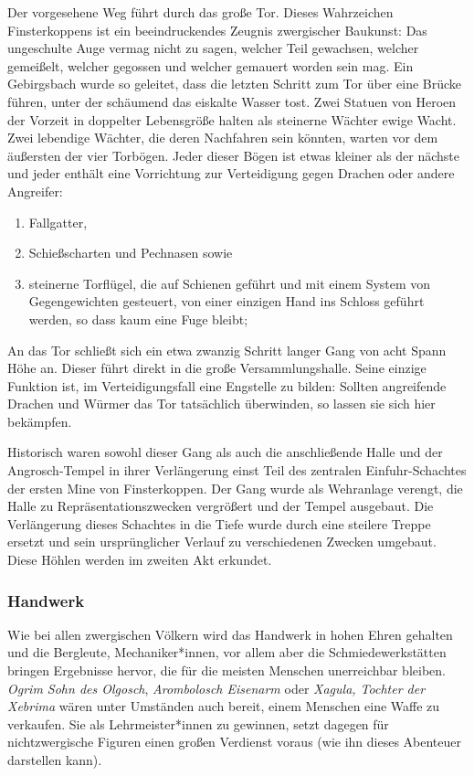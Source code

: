 Der vorgesehene Weg führt durch das große Tor.
Dieses Wahrzeichen Finsterkoppens ist ein beeindruckendes Zeugnis zwergischer Baukunst:
Das ungeschulte Auge vermag nicht zu sagen, welcher Teil gewachsen, welcher gemeißelt, welcher gegossen und welcher gemauert worden sein mag.
Ein Gebirgsbach wurde so geleitet, dass die letzten Schritt zum Tor über eine Brücke führen, unter der schäumend das eiskalte Wasser tost.
Zwei Statuen von Heroen der Vorzeit in doppelter Lebensgröße halten als steinerne Wächter ewige Wacht.
Zwei lebendige Wächter, die deren Nachfahren sein könnten, warten vor dem äußersten der vier Torbögen.
Jeder dieser Bögen ist etwas kleiner als der nächste und  jeder enthält eine Vorrichtung zur Verteidigung gegen Drachen oder andere Angreifer:
\begin{enumerate}\setlength\itemsep {0em}
	\item Fallgatter,
	\item Schießscharten und Pechnasen sowie
	\item steinerne Torflügel, die auf Schienen geführt und mit einem System von Gegengewichten gesteuert, von einer einzigen Hand ins Schloss geführt werden, so dass kaum eine Fuge bleibt;
\end{enumerate}

An das Tor schließt sich ein etwa zwanzig Schritt langer Gang von acht Spann Höhe an.
Dieser führt direkt in die große Versammlungshalle.
Seine einzige Funktion ist, im Verteidigungsfall eine Engstelle zu bilden:
Sollten angreifende Drachen und Würmer das Tor tatsächlich überwinden, so lassen sie sich hier bekämpfen.

Historisch waren sowohl dieser Gang als auch die anschließende Halle und der Angrosch-Tempel in ihrer Verlängerung einst Teil des zentralen Einfuhr-Schachtes der ersten Mine von Finsterkoppen.
Der Gang wurde als Wehranlage verengt, die Halle zu Repräsentationszwecken vergrößert und der Tempel ausgebaut. 
Die Verlängerung dieses Schachtes in die Tiefe wurde durch eine steilere Treppe ersetzt und sein ursprünglicher Verlauf zu verschiedenen Zwecken umgebaut. Diese Höhlen werden im zweiten Akt erkundet.

\subsubsection{Handwerk}
Wie bei allen zwergischen Völkern wird das Handwerk in hohen Ehren gehalten und die Bergleute, Mechaniker*innen, vor allem aber die Schmiedewerkstätten bringen Ergebnisse hervor, die für die meisten Menschen unerreichbar bleiben. \emph{Ogrim Sohn des Olgosch}, \emph{Arombolosch Eisenarm} oder \emph{Xagula, Tochter der Xebrima} wären unter Umständen auch bereit, einem Menschen eine Waffe zu verkaufen. Sie als Lehrmeister*innen zu gewinnen, setzt dagegen für nichtzwergische Figuren einen großen Verdienst voraus (wie ihn dieses Abenteuer darstellen kann).

